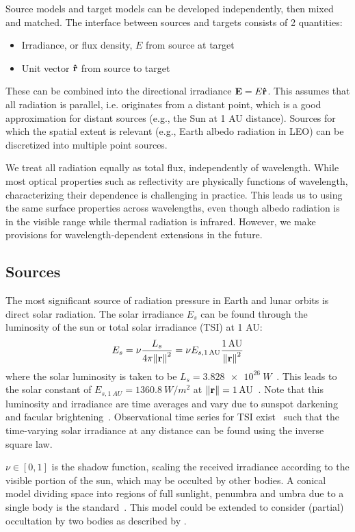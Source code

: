 \documentclass[parskip=full,DIV=15]{scrartcl}
\begin{document}
Source models and target models can be developed independently, then mixed and matched. The interface between sources and targets consists of 2 quantities:
\begin{itemize}
   \item Irradiance, or flux density, $E$ from source at target
   \item Unit vector $\vu r$ from source to target
\end{itemize}
These can be combined into the directional irradiance $\vb E=E \vu r$. This assumes that all radiation is parallel, i.e. originates from a distant point, which is a good approximation for distant sources (e.g., the Sun at 1 AU distance). Sources for which the spatial extent is relevant (e.g., Earth albedo radiation in LEO) can be discretized into multiple point sources.

We treat all radiation equally as total flux, independently of wavelength. While most optical properties such as reflectivity are physically functions of wavelength, characterizing their dependence is challenging in practice. This leads us to using the same surface properties across wavelengths, even though albedo radiation is in the visible range while thermal radiation is infrared. However, we make provisions for wavelength-dependent extensions in the future.



\subsection{Sources}
The most significant source of radiation pressure in Earth and lunar orbits is direct solar radiation. The solar irradiance $E_s$ can be found through the luminosity of the sun or total solar irradiance (TSI) at 1 AU:
\begin{align}
   E_s = \nu\frac{L_s}{4\pi \norm{\vb r}^2} = \nu E_{s,\SI{1}{AU}}\frac{\SI{1}{AU}}{\norm{\vb r}^2}
\end{align}
where the solar luminosity is taken to be $L_s=\SI{3.828e26}{W}$~\cite{Prsa2016}. This leads to the solar constant of $E_{s,\SI{1}{AU}}=\SI{1360.8}{W/m^2}$ at $\norm{\vb r}=\SI{1}{AU}$~\cite{Wild2012}. Note that this luminosity and irradiance are time averages and vary due to sunspot darkening and facular brightening~\cite{Kopp2016}. Observational time series for TSI exist~\cite{Dewitte2017} such that the time-varying solar irradiance at any distance can be found using the inverse square law.

$\nu\in[0,1]$ is the shadow function, scaling the received irradiance according to the visible portion of the sun, which may be occulted by other bodies. A conical model dividing space into regions of full sunlight, penumbra and umbra due to a single body is the standard~\cite{Montenbruck2000}. This model could be extended to consider (partial) occultation by two bodies as described by \textcite{Zhang2019}.
\end{document}
